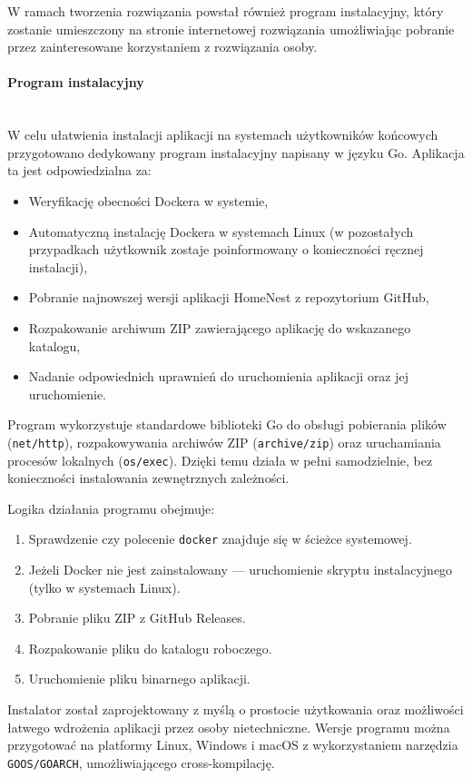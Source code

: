 W ramach tworzenia rozwiązania powstał również program instalacyjny, który zostanie umieszczony na stronie internetowej rozwiązania umożliwiając pobranie przez zainteresowane korzystaniem z rozwiązania osoby.
\paragraph{Program instalacyjny}\mbox{}\\

W celu ułatwienia instalacji aplikacji na systemach użytkowników końcowych przygotowano dedykowany program instalacyjny napisany w języku Go. Aplikacja ta jest odpowiedzialna za:

\begin{itemize}
    \item Weryfikację obecności Dockera w systemie,
    \item Automatyczną instalację Dockera w systemach Linux (w pozostałych przypadkach użytkownik zostaje poinformowany o konieczności ręcznej instalacji),
    \item Pobranie najnowszej wersji aplikacji HomeNest z repozytorium GitHub,
    \item Rozpakowanie archiwum ZIP zawierającego aplikację do wskazanego katalogu,
    \item Nadanie odpowiednich uprawnień do uruchomienia aplikacji oraz jej uruchomienie.
\end{itemize}

Program wykorzystuje standardowe biblioteki Go do obsługi pobierania plików (\texttt{net/http}), rozpakowywania archiwów ZIP (\texttt{archive/zip}) oraz uruchamiania procesów lokalnych (\texttt{os/exec}). Dzięki temu działa w pełni samodzielnie, bez konieczności instalowania zewnętrznych zależności.

Logika działania programu obejmuje:
\begin{enumerate}
    \item Sprawdzenie czy polecenie \texttt{docker} znajduje się w ścieżce systemowej.
    \item Jeżeli Docker nie jest zainstalowany — uruchomienie skryptu instalacyjnego (tylko w systemach Linux).
    \item Pobranie pliku ZIP z GitHub Releases.
    \item Rozpakowanie pliku do katalogu roboczego.
    \item Uruchomienie pliku binarnego aplikacji.
\end{enumerate}

Instalator został zaprojektowany z myślą o prostocie użytkowania oraz możliwości łatwego wdrożenia aplikacji przez osoby nietechniczne. Wersje programu można przygotować na platformy Linux, Windows i macOS z wykorzystaniem narzędzia \texttt{GOOS/GOARCH}, umożliwiającego cross-kompilację.